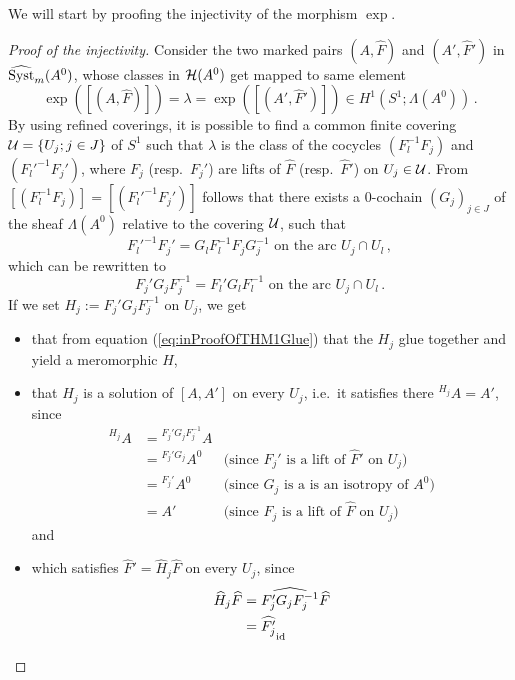 We will start by proofing the injectivity of the morphism $\exp$.
\begin{proof}[Proof of the injectivity]
  Consider the two marked pairs $(A,\hat F)$ and $(A',\hat F')$ in
  $\widehat{\operatorname{Syst}}_m(A^0)$, whose classes in $\mathcal{H}(A^0)$ get mapped to same element
  \[
    \exp([(A,\hat F)])=\lambda=\exp([(A',\hat F')])
      \in H^1(S^1;\Lambda(A^0)) \,.
  \]
  By using refined coverings, it is possible to find a common finite covering
  $\mathcal{U}=\{U_j;j\in J\}$ of $S^1$ such that $\lambda$ is the class of the
  cocycles $(F_l^{-1}F_j)$ and $(F_l'^{-1}F_j')$, where $F_j$ (resp.\ $F_j'$)
  are lifts of $\hat F$ (resp.\ $\hat F'$) on $U_j\in\mathcal{U}$.
  From $[(F_l^{-1}F_j)]=[(F_l'^{-1}F_j')]$ follows that there exists a
  $0$-cochain $(G_j)_{j\in J}$ of the sheaf $\Lambda(A^0)$ relative to the
  covering $\mathcal{U}$, such that
  \[
    F_l'^{-1}F_j'=G_lF_l^{-1}F_jG_j^{-1}
    \text{~on~the~arc~} U_j\cap U_l \,,
  \]
  which can be rewritten to
  \begin{equation}\label{eq:inProofOfTHM1Glue}
    F_j'G_jF_j^{-1} = F_l'G_lF_l^{-1} \text{~on~the~arc~} U_j\cap U_l \,.
  \end{equation}
  If we set $H_j:=F_j'G_{j}F_j^{-1}$ on $U_{j}$, we get \PROBLEM[refactor!!!]
  \begin{itemize}
    \item that from equation (\ref{eq:inProofOfTHM1Glue}) that the $H_j$ glue
      together and yield a meromorphic $H$\PROBLEM[holomorphic??],
    \item that $H_j$ is a solution of $[A,A']$ on every $U_j$, i.e.\ it
      satisfies there ${}^{H_j}A=A'$, since
      \begin{align*}
        {}^{H_j}A &= {}^{F_j'G_{j}F_j^{-1}}A
        \\&={}^{F_j'G_{j}}A^0
                  & \text{(since $F_j'$ is a lift of $\hat F'$ on $U_j$)}
        \\&={}^{F_j'}A^0
                  & \text{(since $G_j$ is a is an isotropy of $A^0$)}
        \\&=A'
                  & \text{(since $F_j$ is a lift of $\hat F$ on $U_j$)}
      \end{align*}
      and
    \item which satisfies $\hat F'=\hat H_j\hat F$ on every $U_j$, since
      \begin{align*}
        \hat H_j\hat F&= \widehat{F_j'G_{j}F_j^{-1}} \hat F
        \\            &= \hat{F_j'}
        \underset{\id}{%
}
\end{align*}
\end{itemize}
\end{proof}
